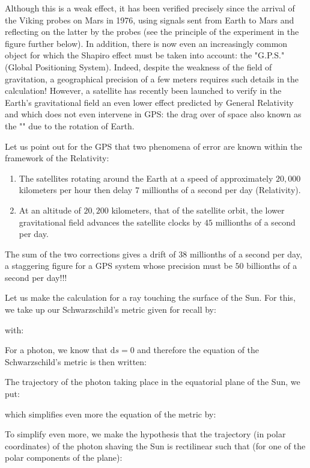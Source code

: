 	Although this is a weak effect, it has been verified precisely since the arrival of the Viking probes on Mars in 1976, using signals sent from Earth to Mars and reflecting on the latter by the probes (see the principle of the experiment in the figure further below). In addition, there is now even an increasingly common object for which the Shapiro effect must be taken into account: the "G.P.S." (Global Positioning System). Indeed, despite the weakness of the field of gravitation, a geographical precision of a few meters requires such details in the calculation! However, a satellite has recently been launched to verify in the Earth's gravitational field an even lower effect predicted by General Relativity and which does not even intervene in GPS: the drag over of space also known as the "" due to the rotation of Earth.
	
	Let us point out for the GPS that two phenomena of error are known within the framework of the Relativity:
	\begin{enumerate}
		\item The satellites rotating around the Earth at a speed of approximately $20,000$ kilometers per hour then delay $7$ millionths of a second per day (Relativity).

		\item At an altitude of $20,200$ kilometers, that of the satellite orbit, the lower gravitational field advances the satellite clocks by $45$ millionths of a second per day.
	\end{enumerate}
	The sum of the two corrections gives a drift of $38$ millionths of a second per day, a staggering figure for a GPS system whose precision must be $50$ billionths of a second per day!!!

	Let us make the calculation for a ray touching the surface of the Sun. For this, we take up our Schwarzschild's metric given for recall by:
	
	with:
	
	For a photon, we know that $\mathrm{d}s=0$ and therefore the equation of the Schwarzschild's metric is then written:
	
	The trajectory of the photon taking place in the equatorial plane of the Sun, we put:
	
	which simplifies even more the equation of the metric by:
	
	To simplify even more, we make the hypothesis that the trajectory (in polar coordinates) of the photon shaving the Sun is rectilinear such that (for one of the polar components of the plane):
	
